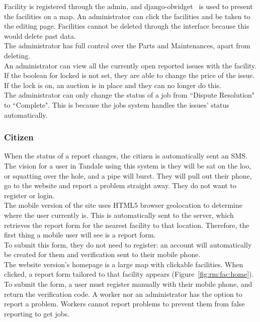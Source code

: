 Facility is registered through the admin, and django-olwidget~\cite{olwidget} is used to present the facilities on a map. An administrator can click the facilities and be taken to the editing page. Facilities cannot be deleted through the interface because this would delete past data. \\

The administrator has full control over the Parts and Maintenances, apart from deleting. \\

An administrator can view all the currently open reported issues with the facility. If the boolean for locked is not set, they are able to change the price of the issue. If the lock is on, an auction is in place and they can no longer do this. \\

The administrator can only change the status of a job from ``Dispute Resolution" to ``Complete". This is because the jobs system handles the issues' status automatically.

\subsubsection{Citizen}
When the status of a report changes, the citizen is automatically sent an SMS. \\

The vision for a user in Tandale using this system is they will be sat on the loo, or squatting over the hole, and a pipe will burst. They will pull out their phone, go to the website and report a problem straight away. They do not want to register or login. \\

The mobile version of the site uses HTML5 browser geolocation to determine where the user currently is. This is automatically sent to the server, which retrieves the report form for the nearest facility to that location. Therefore, the first thing a mobile user will see is a report form. \\

To submit this form, they do not need to register: an account will automatically be created for them and verification sent to their mobile phone. \\

The website version's homepage is a large map with clickable facilities. When clicked, a report form tailored to that facility appears (Figure~\ref{fig:rm:fac:home}). To submit the form, a user must register manually with their mobile phone, and return the verification code. A worker nor an administrator has the option to report a problem. Workers cannot report problems to prevent them from false reporting to get jobs.

